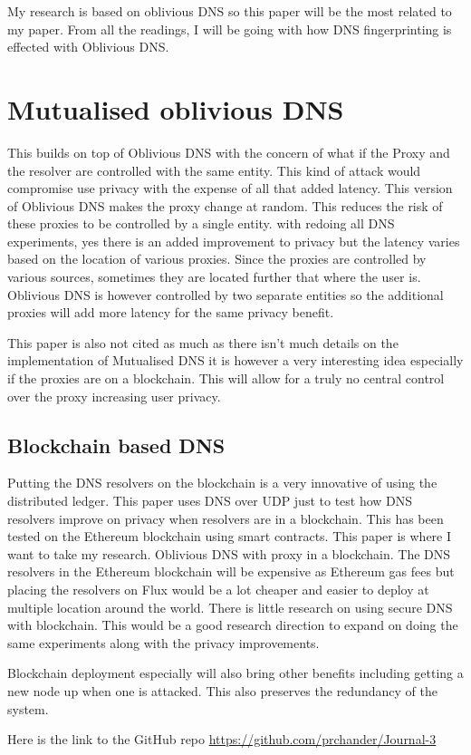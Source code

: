 \documentclass[10pt,conference]{IEEEtran}
\begin{document}
My research is based on oblivious DNS so this paper will be the most related to my paper. From all the readings, I will be going with how DNS fingerprinting is effected with Oblivious DNS.

\section{Mutualised oblivious DNS \cite{kurihara2021mutualized}}
This builds on top of Oblivious DNS with the concern of what if the Proxy and the resolver are controlled with the same entity. This kind of attack would compromise use privacy with the expense of all that added latency. This version of Oblivious DNS makes the proxy change at random. This reduces the risk of these proxies to be controlled by a single entity. with redoing all DNS experiments, yes there is an added improvement to privacy but the latency varies based on the location of various proxies. Since the proxies are controlled by various sources, sometimes they are located further that where the user is. Oblivious DNS is however controlled by two separate entities so the additional proxies will add more latency for the same privacy benefit.

This paper is also not cited as much as there isn't much details on the implementation of Mutualised DNS it is however a very interesting idea especially if the proxies are on a blockchain. This will allow for a truly no central control over the proxy increasing user privacy.

\subsection{Blockchain based DNS \cite{hsieh2022use}}
Putting the DNS resolvers on the blockchain is a very innovative of using the distributed ledger. This paper uses DNS over UDP just to test how DNS resolvers improve on privacy when resolvers are in a blockchain. This has been tested on the Ethereum blockchain using smart contracts. This paper is where I want to take my research. Oblivious DNS with proxy in a blockchain. The DNS resolvers in the Ethereum blockchain will be expensive as Ethereum gas fees but placing the resolvers on Flux would be a lot cheaper and easier to deploy at multiple location around the world. There is little research on using secure DNS with blockchain. This would be a good research direction to expand on doing the same experiments along with the privacy improvements. 

Blockchain deployment especially will also bring other benefits including getting a new node up when one is attacked. This also preserves the redundancy of the system.

Here is the link to the GitHub repo \url{https://github.com/prchander/Journal-3}


\end{document}
